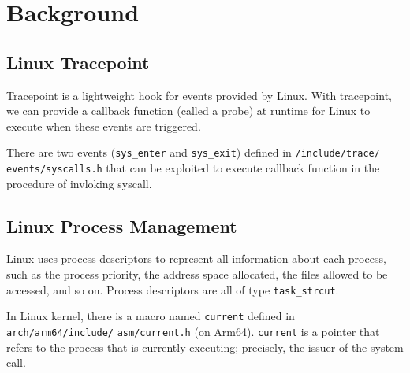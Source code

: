 \section{Background}

\subsection{Linux Tracepoint}

Tracepoint is a lightweight hook for events provided by Linux. With tracepoint, we can provide a callback function (called a probe) at runtime for Linux to execute when these events are triggered. \cite{torvalds_torvaldslinux_2021,using_tracepoint}

There are two events (\texttt{sys\_enter} and \texttt{sys\_exit}) defined in \texttt{/include/trace/} \texttt{events/syscalls.h} that can be exploited to execute callback function in the procedure of invloking syscall. \cite{torvalds_torvaldslinux_2021}

\subsection{Linux Process Management}

Linux uses process descriptors to represent all information about each process, such as the process priority, the address space allocated, the files allowed to be accessed, and so on. Process descriptors are all of type \texttt{task\_strcut}.  \cite{torvalds_torvaldslinux_2021,bovet_cesati_2006}

In Linux kernel, there is a macro named \texttt{current} defined in \texttt{arch/arm64/include/} \texttt{asm/current.h} (on Arm64). \texttt{current} is a pointer that refers to the process that is currently executing; precisely, the issuer of the system call. \cite{corbet_linux_2005,torvalds_torvaldslinux_2021}